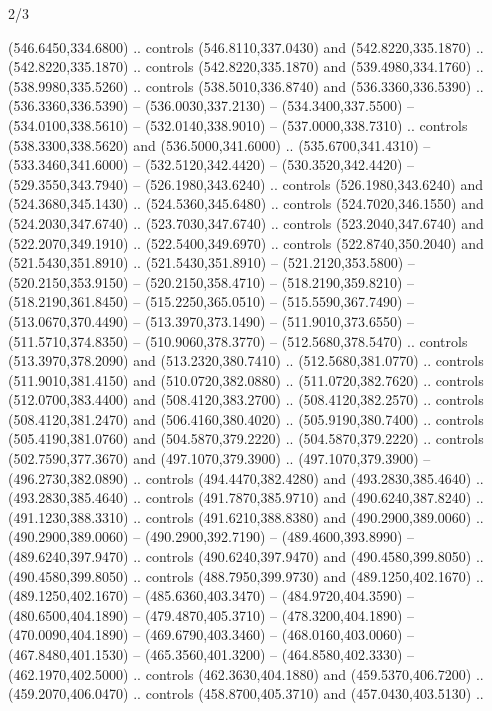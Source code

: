 \begin{flagdescription}{2/3}
\begin{scope}[xshift=0.5\flaglength,yshift=0.5\flagwidth,scale=\flagwidth/638.38]
\begin{scope}[y=0.80pt, x=0.80pt, yscale=-1,shift={(-600,-400)}]
\begin{scope}[shift={(-0.02,2.173)}]
  (546.6450,334.6800) .. controls (546.8110,337.0430) and (542.8220,335.1870) ..
  (542.8220,335.1870) .. controls (542.8220,335.1870) and (539.4980,334.1760) ..
  (538.9980,335.5260) .. controls (538.5010,336.8740) and (536.3360,336.5390) ..
  (536.3360,336.5390) -- (536.0030,337.2130) -- (534.3400,337.5500) --
  (534.0100,338.5610) -- (532.0140,338.9010) -- (537.0000,338.7310) .. controls
  (538.3300,338.5620) and (536.5000,341.6000) .. (535.6700,341.4310) --
  (533.3460,341.6000) -- (532.5120,342.4420) -- (530.3520,342.4420) --
  (529.3550,343.7940) -- (526.1980,343.6240) .. controls (526.1980,343.6240) and
  (524.3680,345.1430) .. (524.5360,345.6480) .. controls (524.7020,346.1550) and
  (524.2030,347.6740) .. (523.7030,347.6740) .. controls (523.2040,347.6740) and
  (522.2070,349.1910) .. (522.5400,349.6970) .. controls (522.8740,350.2040) and
  (521.5430,351.8910) .. (521.5430,351.8910) -- (521.2120,353.5800) --
  (520.2150,353.9150) -- (520.2150,358.4710) -- (518.2190,359.8210) --
  (518.2190,361.8450) -- (515.2250,365.0510) -- (515.5590,367.7490) --
  (513.0670,370.4490) -- (513.3970,373.1490) -- (511.9010,373.6550) --
  (511.5710,374.8350) -- (510.9060,378.3770) -- (512.5680,378.5470) .. controls
  (513.3970,378.2090) and (513.2320,380.7410) .. (512.5680,381.0770) .. controls
  (511.9010,381.4150) and (510.0720,382.0880) .. (511.0720,382.7620) .. controls
  (512.0700,383.4400) and (508.4120,383.2700) .. (508.4120,382.2570) .. controls
  (508.4120,381.2470) and (506.4160,380.4020) .. (505.9190,380.7400) .. controls
  (505.4190,381.0760) and (504.5870,379.2220) .. (504.5870,379.2220) .. controls
  (502.7590,377.3670) and (497.1070,379.3900) .. (497.1070,379.3900) --
  (496.2730,382.0890) .. controls (494.4470,382.4280) and (493.2830,385.4640) ..
  (493.2830,385.4640) .. controls (491.7870,385.9710) and (490.6240,387.8240) ..
  (491.1230,388.3310) .. controls (491.6210,388.8380) and (490.2900,389.0060) ..
  (490.2900,389.0060) -- (490.2900,392.7190) -- (489.4600,393.8990) --
  (489.6240,397.9470) .. controls (490.6240,397.9470) and (490.4580,399.8050) ..
  (490.4580,399.8050) .. controls (488.7950,399.9730) and (489.1250,402.1670) ..
  (489.1250,402.1670) -- (485.6360,403.3470) -- (484.9720,404.3590) --
  (480.6500,404.1890) -- (479.4870,405.3710) -- (478.3200,404.1890) --
  (470.0090,404.1890) -- (469.6790,403.3460) -- (468.0160,403.0060) --
  (467.8480,401.1530) -- (465.3560,401.3200) -- (464.8580,402.3330) --
  (462.1970,402.5000) .. controls (462.3630,404.1880) and (459.5370,406.7200) ..
  (459.2070,406.0470) .. controls (458.8700,405.3710) and (457.0430,403.5130) ..

\end{scope}
\end{scope}
\end{scope}
\end{flagdescription}
